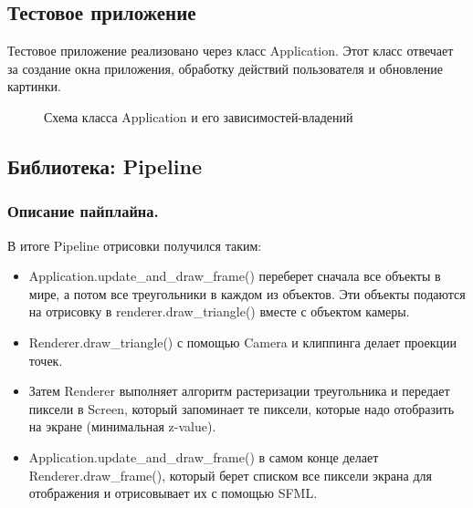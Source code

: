 \documentclass{article}
\begin{document}
\newpage


\subsection{Тестовое приложение}

Тестовое приложение реализовано через класс Application. Этот класс отвечает за создание окна приложения, обработку действий пользователя и обновление картинки.

\begin{center}
\begin{figure}[H]
\caption{Схема класса Application и его зависимостей-владений}
\label{ris:image}
\end{figure}
\end{center}
\newpage

\subsection{Библиотека: Pipeline}

\subsubsection{Описание пайплайна.}

В итоге Pipeline отрисовки получился таким:

\begin{itemize}

\item Application.update\_and\_draw\_frame() переберет сначала все объекты в мире, а потом все треугольники в каждом  из объектов. Эти объекты подаются на отрисовку в renderer.draw\_triangle() вместе с объектом камеры.
\item Renderer.draw\_triangle() с помощью Camera и клиппинга делает проекции точек.
\item Затем Renderer выполняет алгоритм растеризации треугольника и передает пиксели в Screen, который запоминает те пиксели, которые надо отобразить на экране (минимальная z-value).
\item Application.update\_and\_draw\_frame() в самом конце делает Renderer.draw\_frame(), который берет списком все пиксели экрана для отображения и отрисовывает их с помощью SFML.
\end{itemize}
\end{document}
